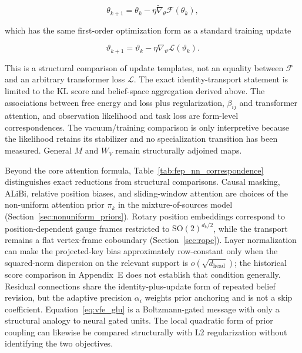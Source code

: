 \documentclass[twoside,11pt]{article}
\begin{document}
\begin{equation}
\theta_{k+1} = \theta_k - \eta \tilde{\nabla}_\theta \mathcal{F}(\theta_k),
\end{equation}

which has the same first-order optimization form as a standard training update

\begin{equation}
\vartheta_{k+1} = \vartheta_k - \eta \nabla_\vartheta \mathcal{L}(\vartheta_k).
\end{equation}

This is a structural comparison of update templates, not an equality between $\mathcal{F}$ and an arbitrary transformer loss $\mathcal{L}$. The exact identity-transport statement is limited to the KL score and belief-space aggregation derived above. The associations between free energy and loss plus regularization, $\beta_{ij}$ and transformer attention, and observation likelihood and task loss are form-level correspondences. The vacuum/training comparison is only interpretive because the likelihood retains its stabilizer and no specialization transition has been measured. General $M$ and $W_V$ remain structurally adjoined maps.

Beyond the core attention formula, Table~\ref{tab:fep_nn_correspondence} distinguishes exact reductions from structural comparisons. Causal masking, ALiBi, relative position biases, and sliding-window attention are choices of the non-uniform attention prior $\pi_k$ in the mixture-of-sources model (Section~\ref{sec:nonuniform_priors}). Rotary position embeddings correspond to position-dependent gauge frames restricted to $\mathrm{SO}(2)^{d_k/2}$, while the transport remains a flat vertex-frame coboundary (Section~\ref{sec:rope}). Layer normalization can make the projected-key bias approximately row-constant only when the squared-norm dispersion on the relevant support is $o(\sqrt{d_{\mathrm{head}}})$; the historical score comparison in Appendix~E does not establish that condition generally. Residual connections share the identity-plus-update form of repeated belief revision, but the adaptive precision $\alpha_i$ weights prior anchoring and is not a skip coefficient. Equation~\eqref{eq:vfe_glu} is a Boltzmann-gated message with only a structural analogy to neural gated units. The local quadratic form of prior coupling can likewise be compared structurally with L2 regularization without identifying the two objectives.
\end{document}
